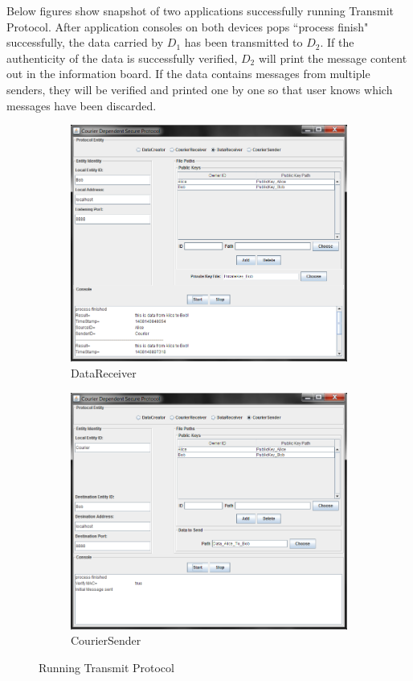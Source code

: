 Below figures show snapshot of two applications successfully running Transmit Protocol. After application consoles on both devices pops ``process finish" successfully, the data carried by $ D_1 $ has been transmitted to $ D_2 $. If the authenticity of the data is successfully verified, $ D_2 $ will print the message content out in the information board. If the data contains messages from multiple senders, they will be verified and printed one by one so that user knows which messages have been discarded.

\begin{figure}[!h]
 \centering
 \begin{subfigure}[b]{0.49\textwidth}
  \includegraphics[width=\textwidth,natwidth=818,natheight=697]{figures/GUIdatareceiver.png}
  \caption{DataReceiver}
 \end{subfigure}
 \begin{subfigure}[b]{0.49\textwidth}
  \includegraphics[width=\textwidth,natwidth=817,natheight=698]{figures/GUIcouriersender.png}
  \caption{CourierSender}
 \end{subfigure}
 \caption{Running Transmit Protocol} 
\end{figure}